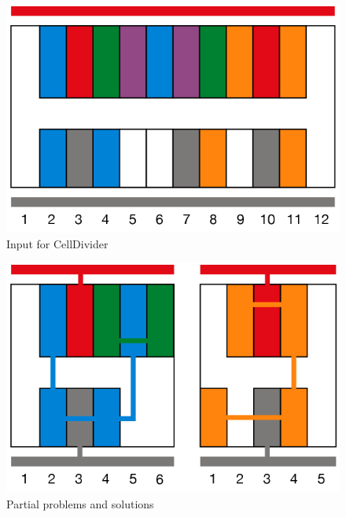 \begin{figure}[h!]
  \centering
  \includegraphics[scale=0.5]{img/design/threebase.png}
  \caption{Input for CellDivider}
  \label{fig:threebase}
\end{figure} 

\begin{figure}[h!]
  \centering
  \includegraphics[scale=0.5]{img/design/threemig.png}
  \caption{Partial problems and solutions}
  \label{fig:threemig}
\end{figure} 

